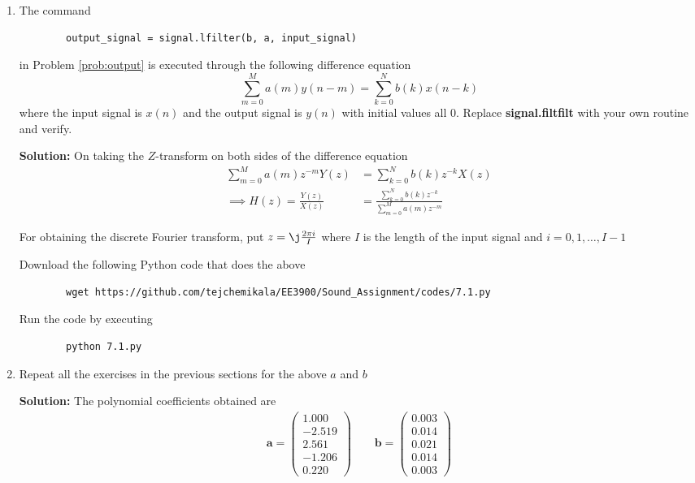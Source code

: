\documentclass[journal,12pt,twocolumn]{IEEEtran}
\newcommand{\solution}{\noindent \textbf{Solution: }}
\providecommand{\brak}[1]{\ensuremath{\left(#1\right)}}
\let\vec\mathbf
\numberwithin{equation}{section}
\renewcommand\thesection{\arabic{section}}
\newcommand{\myvec}[1]{\ensuremath{\begin{pmatrix}#1\end{pmatrix}}}
\begin{document}
	\begin{enumerate}[label=\thesection.\arabic*]
	\item The command
	\begin{lstlisting}
		output_signal = signal.lfilter(b, a, input_signal)
	\end{lstlisting}
	in Problem \ref{prob:output} is executed through the following difference equation
	\begin{equation}
		\label{eq:iir_filter_gen}
 		\sum _{m=0}^{M}a\brak{m}y\brak{n-m}=\sum _{k=0}^{N}b\brak{k}x\brak{n-k}
	\end{equation}
	where the input signal is $x(n)$ and the output signal is $y(n)$ with initial values all 0. Replace \textbf{signal.filtfilt} with your own routine and verify.
	
	\solution On taking the $Z$-transform on both sides of the difference equation
	\begin{align}
		\sum _{m=0}^{M}a\brak{m} z^{-m} Y(z) &= \sum _{k=0}^{N}b\brak{k} z^{-k} X(z) \\
		\implies H(z) = \frac{Y(z)}{X(z)} &= \frac{\sum _{k=0}^{N}b\brak{k} z^{-k}}{\sum _{m=0}^{M}a\brak{m} z^{-m}}
	\end{align}
	
	For obtaining the discrete Fourier transform, put $z = \j \frac{2\pi i}{I}$ where $I$ is the length of the input signal and $i = 0, 1, \ldots, I-1$
	
	Download the following Python code that does the above
	\begin{lstlisting}
		wget https://github.com/tejchemikala/EE3900/Sound_Assignment/codes/7.1.py
	\end{lstlisting}
	
	Run the code by executing
	\begin{lstlisting}
		python 7.1.py
	\end{lstlisting}
	
	\item Repeat all the exercises in the previous sections for the above $a$ and $b$
	
	\solution The polynomial coefficients obtained are
	\begin{align}
		\vec{a} = \myvec{1.000 \\ -2.519 \\ 2.561 \\ -1.206 \\ 0.220} \qquad
		\vec{b} = \myvec{0.003 \\ 0.014 \\ 0.021 \\ 0.014 \\ 0.003}
	\end{align}
	

\end{enumerate}
\end{document}
